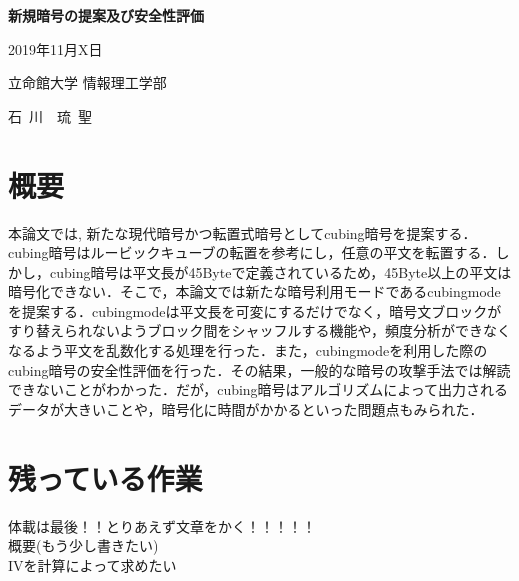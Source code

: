\documentclass[a4p]{jarticle}
\begin{document}
\begin{center}
\vspace*{4.5cm}
{\huge\bf 新規暗号の提案及び安全性評価}
\vspace*{3cm}

{\large 2019年11月X日}
\vspace*{3cm}

{\large 立命館大学 情報理工学部}
\vspace*{5mm}

{\Large 石~川~~琉~聖}
\end{center}

\thispagestyle{empty}
\clearpage
\addtocounter{page}{-1}
\newpage

\section*{概要}

本論文では, 新たな現代暗号かつ転置式暗号としてcubing暗号を提案する．cubing暗号はルービックキューブの転置を参考にし，任意の平文を転置する．しかし，cubing暗号は平文長が45Byteで定義されているため，45Byte以上の平文は暗号化できない．そこで，本論文では新たな暗号利用モードであるcubingmodeを提案する．cubingmodeは平文長を可変にするだけでなく，暗号文ブロックがすり替えられないようブロック間をシャッフルする機能や，頻度分析ができなくなるよう平文を乱数化する処理を行った．また，cubingmodeを利用した際のcubing暗号の安全性評価を行った．その結果，一般的な暗号の攻撃手法では解読できないことがわかった．だが，cubing暗号はアルゴリズムによって出力されるデータが大きいことや，暗号化に時間がかかるといった問題点もみられた．

\newpage

\tableofcontents
\clearpage
\section{残っている作業}
体載は最後！！とりあえず文章をかく！！！！！\\
概要(もう少し書きたい)\\
IVを計算によって求めたい\\
\end{document}
